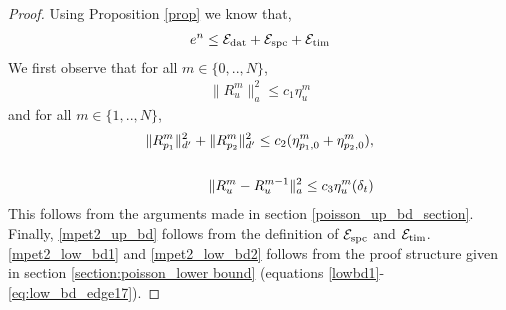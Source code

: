 \begin{proof}
Using Proposition \ref{prop} we know that, 
\begin{align}
e^n \leq \mathcal{E}_{\textnormal{dat}} + \mathcal{E}_{\textnormal{spc}} + \mathcal{E}_{\textnormal{tim}} 
\end{align}
We first observe that for all $m \in \{0,..,N\}$,
\begin{align}
\| R_u^m\|^2_a \leq c_1\eta^m_u
\end{align}
and for all $m \in \{1,..,N\}$,
\begin{align}
\| R_{p_1}^m\|^2_{d'} + \| R_{p_2}^m\|^2_{d'} \leq c_2(\eta^m_{p_1,0} + \eta^m_{p_2,0}), 
\\ 
\notag\\
\| R_u^m -R_u^{m-1} \|^2_a \leq c_3\eta^m_u(\delta_t) \notag
\end{align}
This follows from the arguments made in section \ref{poisson_up_bd_section}. Finally, \eqref{mpet2_up_bd} follows from the definition of $\mathcal{E}_{\textnormal{spc}}$ and $\mathcal{E}_{\textnormal{tim}}$. \eqref{mpet2_low_bd1} and \eqref{mpet2_low_bd2} follows from the proof structure given in section \ref{section:poisson_lower bound} (equations \eqref{lowbd1}-\eqref{eq:low_bd_edge17}). 
\end{proof}
%
